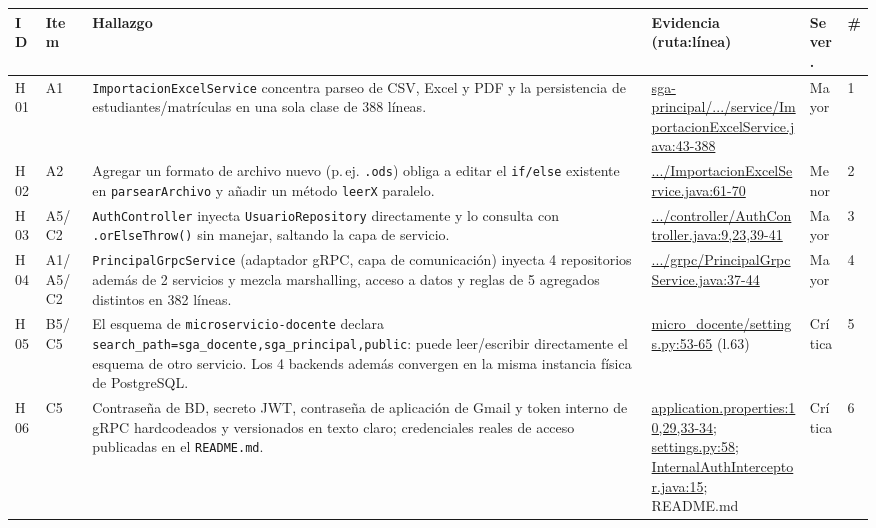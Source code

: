 \documentclass[11pt,a4paper]{article}
\begin{document}
        {\small
    \begin{xltabular}{\textwidth}{@{}p{0.55cm}p{0.95cm}X p{3.5cm}p{1.05cm}p{0.6cm}@{}}
        \toprule
        \textbf{ID} & \textbf{Item} & \textbf{Hallazgo} & \textbf{Evidencia (ruta:l\'inea)} & \textbf{Sever.} & \textbf{\#} \\
        \midrule
        \endhead
        H01 & A1 & \texttt{ImportacionExcelService} concentra parseo de CSV, Excel y PDF y la persistencia de estudiantes/matr\'iculas en una sola clase de 388 l\'ineas. & {\raggedright\scriptsize\url{sga-principal/.../service/ImportacionExcelService.java:43-388}\par} & Mayor & 1 \\
        H02 & A2 & Agregar un formato de archivo nuevo (p.\,ej. \texttt{.ods}) obliga a editar el \texttt{if/else} existente en \texttt{parsearArchivo} y a\~nadir un m\'etodo \texttt{leerX} paralelo. & {\raggedright\scriptsize\url{.../ImportacionExcelService.java:61-70}\par} & Menor & 2 \\
        H03 & A5/C2 & \texttt{AuthController} inyecta \texttt{UsuarioRepository} directamente y lo consulta con \texttt{.orElseThrow()} sin manejar, saltando la capa de servicio. & {\raggedright\scriptsize\url{.../controller/AuthController.java:9,23,39-41}\par} & Mayor & 3 \\
        H04 & A1/A5/C2 & \texttt{PrincipalGrpcService} (adaptador gRPC, capa de comunicaci\'on) inyecta 4 repositorios adem\'as de 2 servicios y mezcla marshalling, acceso a datos y reglas de 5 agregados distintos en 382 l\'ineas. & {\raggedright\scriptsize\url{.../grpc/PrincipalGrpcService.java:37-44}\par} & Mayor & 4 \\
        H05 & B5/C5 & El esquema de \texttt{microservicio-docente} declara \texttt{search\_path=sga\_docente,sga\_principal,public}: puede leer/escribir directamente el esquema de otro servicio. Los 4 backends adem\'as convergen en la misma instancia f\'isica de PostgreSQL. & {\raggedright\scriptsize\url{micro_docente/settings.py:53-65} (l.63)\par} & Cr\'itica & 5 \\
        H06 & C5 & Contrase\~na de BD, secreto JWT, contrase\~na de aplicaci\'on de Gmail y token interno de gRPC hardcodeados y versionados en texto claro; credenciales reales de acceso publicadas en el \texttt{README.md}. & {\raggedright\scriptsize\url{application.properties:10,29,33-34};\newline \url{settings.py:58};\newline \url{InternalAuthInterceptor.java:15}; README.md\par} & Cr\'itica & 6 \\

\end{xltabular}}
\end{document}
